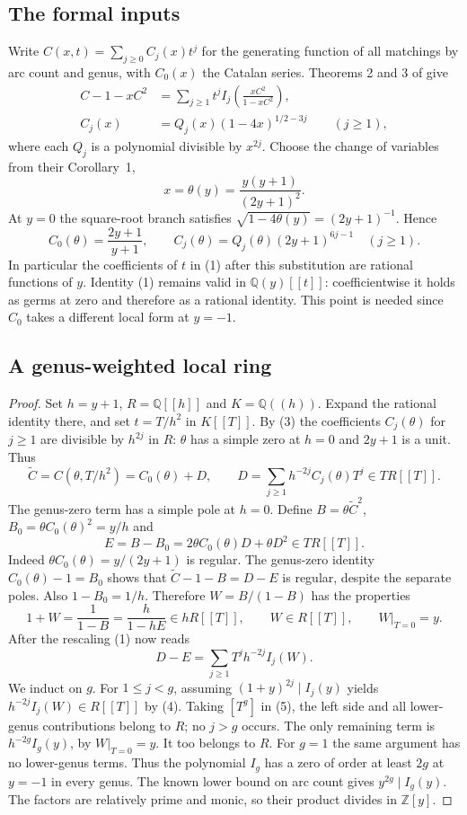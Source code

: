 \documentclass[11pt,a4paper]{article}
\numberwithin{equation}{section}
\theoremstyle{definition}
\theoremstyle{remark}
\begin{document}
\subsection*{The formal inputs}
Write $C(x,t)=\sum_{j\ge0}C_j(x)t^j$ for the generating function of
all matchings by arc count and genus, with $C_0(x)$ the Catalan series.
Theorems 2 and 3 of \cite{r45taisho:HLR} give
\begin{align}
 C-1-xC^2&=\sum_{j\ge1}t^j I_j\left(\frac{xC^2}{1-xC^2}\right), \tag{1}\\
 C_j(x)&=Q_j(x)(1-4x)^{1/2-3j}\qquad(j\ge1), \tag{2}
\end{align}
where each $Q_j$ is a polynomial divisible by $x^{2j}$.
Choose the change of variables from their Corollary~1,
\[
 x=\theta(y)=\frac{y(y+1)}{(2y+1)^2}.
\]
At $y=0$ the square-root branch satisfies
$\sqrt{1-4\theta(y)}=(2y+1)^{-1}$. Hence
\begin{equation}
 C_0(\theta)=\frac{2y+1}{y+1},\qquad
 C_j(\theta)=Q_j(\theta)(2y+1)^{6j-1}\quad(j\ge1).
 \tag{3}
\end{equation}
In particular the coefficients of $t$ in (1) after this substitution
are rational functions of $y$. Identity (1) remains valid in
$\mathbb Q(y)[[t]]$: coefficientwise it holds as germs at zero and
therefore as a rational identity. This point is needed since $C_0$
takes a different local form at $y=-1$.
\subsection*{A genus-weighted local ring}
\begin{proof}
Set $h=y+1$, $R=\mathbb Q[[h]]$ and $K=\mathbb Q((h))$.
Expand the rational identity there, and set $t=T/h^2$ in $K[[T]]$.
By (3) the coefficients $C_j(\theta)$ for $j\ge1$ are divisible by
$h^{2j}$ in $R$: $\theta$ has a simple zero at $h=0$ and $2y+1$ is
a unit. Thus
\[
 \widetilde C=C(\theta,T/h^2)=C_0(\theta)+D,\qquad
 D=\sum_{j\ge1}h^{-2j}C_j(\theta)T^j\in T R[[T]].
\]
The genus-zero term has a simple pole at $h=0$. Define
$B=\theta\widetilde C^2$, $B_0=\theta C_0(\theta)^2=y/h$ and
\[
 E=B-B_0=2\theta C_0(\theta)D+\theta D^2\in TR[[T]].
\]
Indeed $\theta C_0(\theta)=y/(2y+1)$ is regular. The genus-zero
identity $C_0(\theta)-1=B_0$ shows that
$\widetilde C-1-B=D-E$ is regular, despite the separate poles.
Also $1-B_0=1/h$. Therefore $W=B/(1-B)$ has the properties
\[
 1+W=\frac{1}{1-B}=\frac{h}{1-hE}\in hR[[T]],\qquad
 W\in R[[T]],\qquad W|_{T=0}=y.
\tag{4}
\]
After the rescaling (1) now reads
\[
 D-E=\sum_{j\ge1} T^j h^{-2j} I_j(W).
\tag{5}
\]
We induct on $g$. For $1\le j<g$, assuming
$(1+y)^{2j}\mid I_j(y)$ yields
$h^{-2j}I_j(W)\in R[[T]]$ by (4). Taking $[T^g]$ in (5), the left
side and all lower-genus contributions belong to $R$; no $j>g$ occurs.
The only remaining term is $h^{-2g}I_g(y)$, by $W|_{T=0}=y$.
It too belongs to $R$. For $g=1$ the same argument has no
lower-genus terms. Thus the polynomial $I_g$ has a zero of order
at least $2g$ at $y=-1$ in every genus. The known lower bound on
arc count gives $y^{2g}\mid I_g(y)$. The factors are relatively prime
and monic, so their product divides in $\mathbb Z[y]$.
\end{proof}
\end{document}
